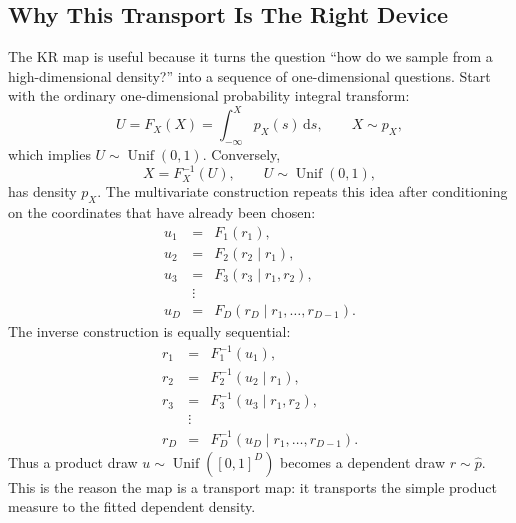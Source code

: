 \documentclass[11pt]{article}
\numberwithin{equation}{section}
\newcommand{\dd}{\,\mathrm d}
\begin{document}
\subsection*{Why This Transport Is The Right Device}

The KR map is useful because it turns the question ``how do we sample from a
high-dimensional density?'' into a sequence of one-dimensional questions.
Start with the ordinary one-dimensional probability integral transform:
\begin{equation}
    U=F_X(X)=\int_{-\infty}^{X}p_X(s)\dd s,
    \qquad X\sim p_X,
    \label{eq:p26-kr-teach-1}
\end{equation}
which implies \(U\sim\operatorname{Unif}(0,1)\).  Conversely,
\begin{equation}
    X=F_X^{-1}(U),
    \qquad U\sim\operatorname{Unif}(0,1),
    \label{eq:p26-kr-teach-2}
\end{equation}
has density \(p_X\).  The multivariate construction repeats this idea after
conditioning on the coordinates that have already been chosen:
\begin{equation}
\begin{array}{rcl}
u_1 &=& F_1(r_1),\\[1mm]
u_2 &=& F_2(r_2\mid r_1),\\[1mm]
u_3 &=& F_3(r_3\mid r_1,r_2),\\
&\vdots&\\
u_D &=& F_D(r_D\mid r_1,\ldots,r_{D-1}).
\end{array}
    \label{eq:p26-kr-teach-3}
\end{equation}
The inverse construction is equally sequential:
\begin{equation}
\begin{array}{rcl}
r_1 &=& F_1^{-1}(u_1),\\[1mm]
r_2 &=& F_2^{-1}(u_2\mid r_1),\\[1mm]
r_3 &=& F_3^{-1}(u_3\mid r_1,r_2),\\
&\vdots&\\
r_D &=& F_D^{-1}(u_D\mid r_1,\ldots,r_{D-1}).
\end{array}
    \label{eq:p26-kr-teach-4}
\end{equation}
Thus a product draw \(u\sim\operatorname{Unif}([0,1]^D)\) becomes a dependent
draw \(r\sim\widehat p\).  This is the reason the map is a transport map:
it transports the simple product measure to the fitted dependent density.
\end{document}
